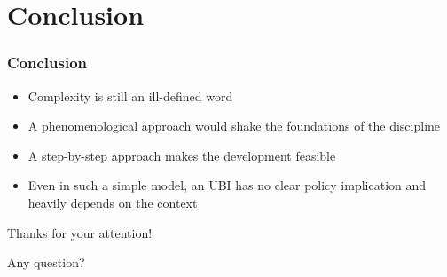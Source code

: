 \documentclass[]{beamer}
\begin{document}
\section*{Conclusion}
\begin{frame}
	\frametitle{Conclusion}
	\begin{itemize}
		\item Complexity is still an ill-defined word
		\item A phenomenological approach would shake the foundations of the discipline
		\item A step-by-step approach makes the development feasible
		\item Even in such a simple model, an UBI has no clear policy implication and heavily depends on the context
	\end{itemize}
\end{frame}

\begin{frame}
    \centering
    Thanks for your attention!

    Any question?
\end{frame}
\end{document}
